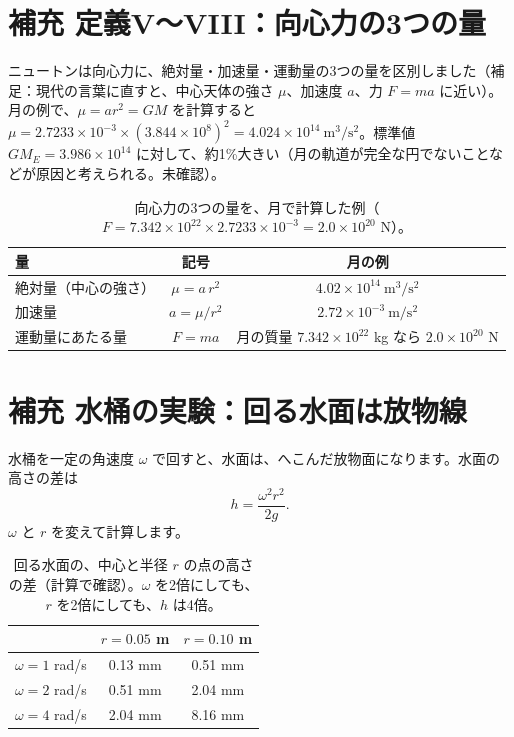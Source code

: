 \documentclass[a4paper,11pt,openany]{ltjsbook}
\begin{document}
\section{補充 定義V〜VIII：向心力の3つの量}

ニュートンは向心力に、絶対量・加速量・運動量の3つの量を区別しました（補足：現代の言葉に直すと、中心天体の強さ $\mu$、加速度 $a$、力 $F=ma$ に近い）。月の例で、$\mu=a r^2=GM$ を計算すると $\mu=2.7233\times10^{-3}\times(3.844\times10^8)^2=4.024\times10^{14}\ \mathrm{m^3/s^2}$。標準値 $GM_E=3.986\times10^{14}$ に対して、約1\%大きい（月の軌道が完全な円でないことなどが原因と考えられる。未確認）。

\begin{table}[htbp]
\centering
\begin{tabular}{lcc}
\toprule
量 & 記号 & 月の例\\
\midrule
絶対量（中心の強さ） & $\mu=a\,r^2$ & $4.02\times10^{14}\ \mathrm{m^3/s^2}$\\
加速量 & $a=\mu/r^2$ & $2.72\times10^{-3}\ \mathrm{m/s^2}$\\
運動量にあたる量 & $F=ma$ & 月の質量 $7.342\times10^{22}$ kg なら $2.0\times10^{20}$ N\\
\bottomrule
\end{tabular}
\caption{向心力の3つの量を、月で計算した例（$F=7.342\times10^{22}\times2.7233\times10^{-3}=2.0\times10^{20}$ N）。}
\end{table}

\section{補充 水桶の実験：回る水面は放物線}

水桶を一定の角速度 $\omega$ で回すと、水面は、へこんだ放物面になります。水面の高さの差は
\[
h=\frac{\omega^2r^2}{2g}.
\]
$\omega$ と $r$ を変えて計算します。

\begin{table}[htbp]
\centering
\begin{tabular}{c|cc}
\toprule
 & $r=0.05$ m & $r=0.10$ m\\
\midrule
$\omega=1$ rad/s & 0.13 mm & 0.51 mm\\
$\omega=2$ rad/s & 0.51 mm & 2.04 mm\\
$\omega=4$ rad/s & 2.04 mm & 8.16 mm\\
\bottomrule
\end{tabular}
\caption{回る水面の、中心と半径 $r$ の点の高さの差（計算で確認）。$\omega$ を2倍にしても、$r$ を2倍にしても、$h$ は4倍。}
\end{table}
\end{document}
